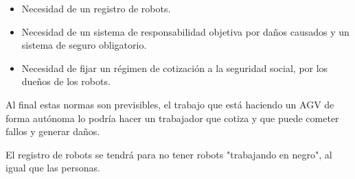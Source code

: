 \begin{itemize}
	\item Necesidad de un registro de robots.
	\item Necesidad de un sistema de responsabilidad objetiva por daños causados y un sistema de seguro obligatorio.
	\item Necesidad de fijar un régimen de cotización a la seguridad social, por los dueños de los robots.
\end{itemize}

Al final estas normas son previsibles, el trabajo que está haciendo un AGV de forma autónoma lo podría hacer un trabajador que cotiza y que puede cometer fallos y generar daños. 

El registro de robots se tendrá para no tener robots "trabajando en negro", al igual que las personas.


